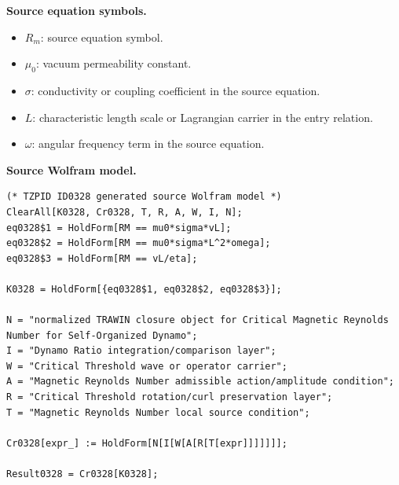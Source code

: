 \begin{minipage}[t]{0.49\linewidth}
\begingroup
\small
\raggedright
\textbf{Source equation symbols.}\par
\begin{itemize}[leftmargin=1.35em,itemsep=1pt,topsep=1pt,parsep=0pt]
    \item $R_m$: source equation symbol.
    \item $\mu_0$: vacuum permeability constant.
    \item $\sigma$: conductivity or coupling coefficient in the source equation.
    \item $L$: characteristic length scale or Lagrangian carrier in the entry relation.
    \item $\omega$: angular frequency term in the source equation.
\end{itemize}
\endgroup
\end{minipage}\hfill
\begin{minipage}[t]{0.47\linewidth}
\begingroup
\scriptsize
\raggedright
\textbf{Source Wolfram model.}\par
\begin{Verbatim}[fontsize=\tiny,breaklines=true,breakanywhere=true]
(* TZPID ID0328 generated source Wolfram model *)
ClearAll[K0328, Cr0328, T, R, A, W, I, N];
eq0328$1 = HoldForm[RM == mu0*sigma*vL];
eq0328$2 = HoldForm[RM == mu0*sigma*L^2*omega];
eq0328$3 = HoldForm[RM == vL/eta];

K0328 = HoldForm[{eq0328$1, eq0328$2, eq0328$3}];

N = "normalized TRAWIN closure object for Critical Magnetic Reynolds Number for Self-Organized Dynamo";
I = "Dynamo Ratio integration/comparison layer";
W = "Critical Threshold wave or operator carrier";
A = "Magnetic Reynolds Number admissible action/amplitude condition";
R = "Critical Threshold rotation/curl preservation layer";
T = "Magnetic Reynolds Number local source condition";

Cr0328[expr_] := HoldForm[N[I[W[A[R[T[expr]]]]]]];

Result0328 = Cr0328[K0328];
\end{Verbatim}
\endgroup
\end{minipage}

